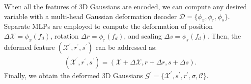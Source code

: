 \documentclass[10pt,twocolumn,letterpaper]{article}
\begin{document}
When all the features of 3D Gaussians are encoded, we can compute any desired variable with a multi-head Gaussian deformation decoder $\mathcal{D}=\{\phi_x, \phi_r, \phi_s\}$. Separate MLPs are employed to compute the deformation of position $\Delta \mathcal{X} = \phi_x(f_d)$, rotation $\Delta r= \phi_r(f_d)$, and scaling $\Delta s=\phi_s(f_d)$.
Then, the deformed feature $(\mathcal{X}^\prime,r^\prime,s^\prime)$ can be addressed as:
\begin{align}
    & (\mathcal{X}^\prime, r^\prime, s^\prime) = (\mathcal{X} + \Delta \mathcal{X}, r + \Delta r, s + \Delta s) .
\end{align}
Finally, we obtain the deformed 3D Gaussians $\mathcal{G}^\prime=\{\mathcal{X}^\prime, s^\prime, r^\prime,\sigma,\mathcal{C} \}$.



\end{document}

